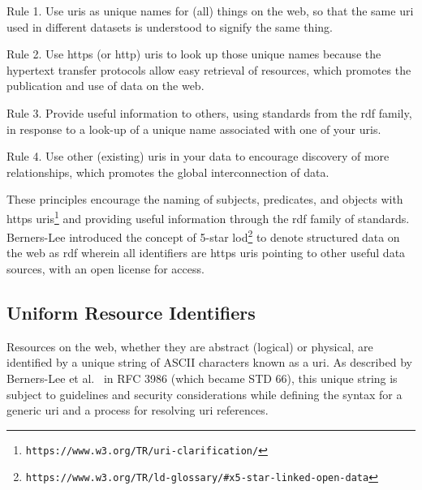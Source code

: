 \begin{doublespace}
Rule 1.
Use \acp{uri} as unique names for (all) things on the web,
so that the same \ac{uri} used in different datasets is understood to signify
the same thing.

Rule 2.
Use \ac{https} (or \ac{http}) \acp{uri} to look up those unique names
because the hypertext transfer protocols allow easy retrieval of resources,
which promotes the publication and use of data on the web.

Rule 3.  
Provide useful information to others, using standards from the \ac{rdf} family,
in response to a look-up of a unique name associated with one of your \acp{uri}.
   
Rule 4.
Use other (existing) \acp{uri} in your data to encourage discovery of more relationships,
which promotes the global interconnection of data.

These principles encourage the
naming of subjects, predicates, and objects with 
\ac{https} \acp{uri}\footnote{\tt https://www.w3.org/TR/uri-clarification/} 
and providing useful information through the \ac{rdf} family of standards.
Berners-Lee introduced the concept of 5-star 
\ac{lod}\footnote{\tt https://www.w3.org/TR/ld-glossary/\#x5-star-linked-open-data}
to denote structured data on the web as \ac{rdf} wherein all identifiers are \ac{https} \acp{uri}
pointing to other useful data sources, with an open license for access.

\subsection{Uniform Resource Identifiers}
\label{subsec:uri}

Resources on the web, 
whether they are abstract (logical) or physical,
are identified by a unique string of ASCII characters known 
as a \ac{uri}.
As described by Berners-Lee et al.~\cite{RFC3986uri} 
in RFC 3986 (which became STD 66), 
this unique string is subject to guidelines and security considerations 
while defining the syntax for a generic \ac{uri} 
and a process for resolving \ac{uri} references. 


\end{doublespace}
